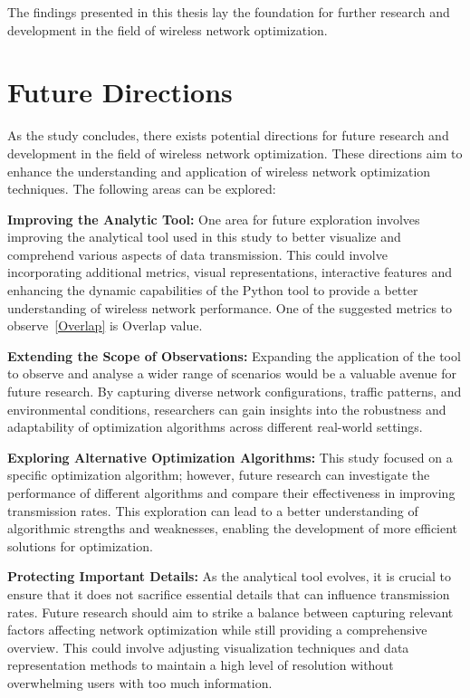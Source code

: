 The findings presented in this thesis lay the foundation for further research and development in the field of wireless network optimization.

\section{Future Directions}

As the study concludes, there exists potential directions for future research and development in the field of wireless network optimization. These directions aim to enhance the understanding and application of wireless network optimization techniques. The following areas can be explored:

\textbf{Improving the Analytic Tool:} One area for future exploration involves improving the analytical tool used in this study to better visualize and comprehend various aspects of data transmission. This could involve incorporating additional metrics, visual representations, interactive features and enhancing the dynamic capabilities of the Python tool to provide a better understanding of wireless network performance. One of the suggested metrics to observe~\ref{Overlap} is Overlap value.

\textbf{Extending the Scope of Observations:} Expanding the application of the tool to observe and analyse a wider range of scenarios would be a valuable avenue for future research. By capturing diverse network configurations, traffic patterns, and environmental conditions, researchers can gain insights into the robustness and adaptability of optimization algorithms across different real-world settings.

\textbf{Exploring Alternative Optimization Algorithms:} This study focused on a specific optimization algorithm; however, future research can investigate the performance of different algorithms and compare their effectiveness in improving transmission rates. This exploration can lead to a better understanding of algorithmic strengths and weaknesses, enabling the development of more efficient solutions for optimization.

\textbf{Protecting Important Details:} As the analytical tool evolves, it is crucial to ensure that it does not sacrifice essential details that can influence transmission rates. Future research should aim to strike a balance between capturing relevant factors affecting network optimization while still providing a comprehensive overview. This could involve adjusting visualization techniques and data representation methods to maintain a high level of resolution without overwhelming users with too much information.